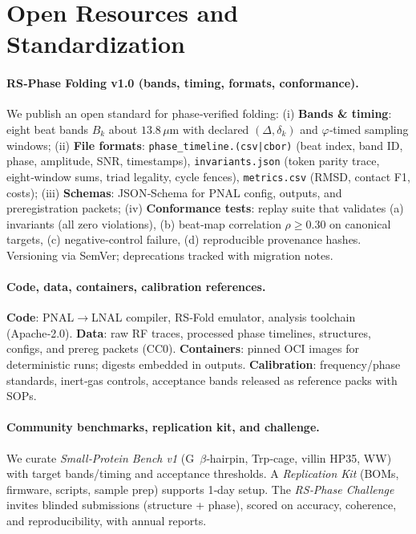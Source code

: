 \documentclass[12pt,a4paper]{article}
\begin{document}
\section{Open Resources and Standardization}

\paragraph{RS‑Phase Folding v1.0 (bands, timing, formats, conformance).}
We publish an open standard for phase‑verified folding:
(i) \textbf{Bands \& timing}: eight beat bands $B_k$ about $13.8\,\mu$m with declared $(\Delta,\delta_k)$ and $\varphi$‑timed sampling windows; 
(ii) \textbf{File formats}: \texttt{phase\_timeline.(csv|cbor)} (beat index, band ID, phase, amplitude, SNR, timestamps), \texttt{invariants.json} (token parity trace, eight‑window sums, triad legality, cycle fences), \texttt{metrics.csv} (RMSD, contact F1, costs);
(iii) \textbf{Schemas}: JSON‑Schema for PNAL config, outputs, and preregistration packets; 
(iv) \textbf{Conformance tests}: replay suite that validates (a) invariants (all zero violations), (b) beat‑map correlation $\rho\ge0.30$ on canonical targets, (c) negative‑control failure, (d) reproducible provenance hashes.
Versioning via SemVer; deprecations tracked with migration notes.

\paragraph{Code, data, containers, calibration references.}
\textbf{Code}: PNAL$\to$LNAL compiler, RS‑Fold emulator, analysis toolchain (Apache‑2.0).
\textbf{Data}: raw RF traces, processed phase timelines, structures, configs, and prereg packets (CC0).
\textbf{Containers}: pinned OCI images for deterministic runs; digests embedded in outputs.
\textbf{Calibration}: frequency/phase standards, inert‑gas controls, acceptance bands released as reference packs with SOPs.

\paragraph{Community benchmarks, replication kit, and challenge.}
We curate \textit{Small‑Protein Bench v1} (G~$\beta$‑hairpin, Trp‑cage, villin HP35, WW) with target bands/timing and acceptance thresholds. A \textit{Replication Kit} (BOMs, firmware, scripts, sample prep) supports 1‑day setup. The \textit{RS‑Phase Challenge} invites blinded submissions (structure + phase), scored on accuracy, coherence, and reproducibility, with annual reports.
\end{document}
